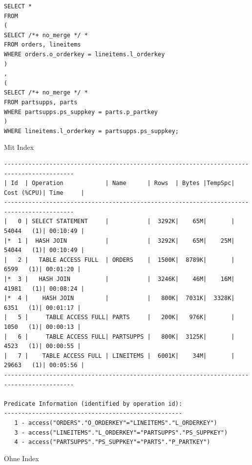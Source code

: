\documentclass[10pt]{article}
\begin{document}
\newpage
\begin{lstlisting}[style=sql]
SELECT *
FROM
(
SELECT /*+ no_merge */ *
FROM orders, lineitems
WHERE orders.o_orderkey = lineitems.l_orderkey
)
,
(
SELECT /*+ no_merge */ *
FROM partsupps, parts
WHERE partsupps.ps_suppkey = parts.p_partkey
)
WHERE lineitems.l_orderkey = partsupps.ps_suppkey;
\end{lstlisting}
Mit Index
\begin{lstlisting}[style=queryexecutionplan]
------------------------------------------------------------------------------------------
| Id  | Operation            | Name      | Rows  | Bytes |TempSpc| Cost (%CPU)| Time     |
------------------------------------------------------------------------------------------
|   0 | SELECT STATEMENT     |           |  3292K|    65M|       | 54044   (1)| 00:10:49 |
|*  1 |  HASH JOIN           |           |  3292K|    65M|    25M| 54044   (1)| 00:10:49 |
|   2 |   TABLE ACCESS FULL  | ORDERS    |  1500K|  8789K|       |  6599   (1)| 00:01:20 |
|*  3 |   HASH JOIN          |           |  3246K|    46M|    16M| 41981   (1)| 00:08:24 |
|*  4 |    HASH JOIN         |           |   800K|  7031K|  3328K|  6351   (1)| 00:01:17 |
|   5 |     TABLE ACCESS FULL| PARTS     |   200K|   976K|       |  1050   (1)| 00:00:13 |
|   6 |     TABLE ACCESS FULL| PARTSUPPS |   800K|  3125K|       |  4523   (1)| 00:00:55 |
|   7 |    TABLE ACCESS FULL | LINEITEMS |  6001K|    34M|       | 29663   (1)| 00:05:56 |
------------------------------------------------------------------------------------------
 
Predicate Information (identified by operation id):
---------------------------------------------------
   1 - access("ORDERS"."O_ORDERKEY"="LINEITEMS"."L_ORDERKEY")
   3 - access("LINEITEMS"."L_ORDERKEY"="PARTSUPPS"."PS_SUPPKEY")
   4 - access("PARTSUPPS"."PS_SUPPKEY"="PARTS"."P_PARTKEY")
\end{lstlisting}
Ohne Index
\end{document}
